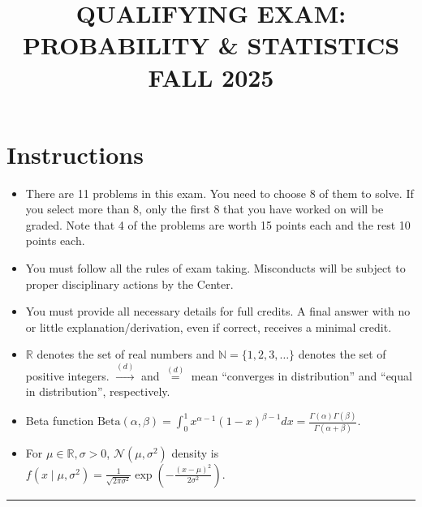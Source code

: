 \documentclass[11pt,a4paper]{article}
\title{\textbf{QUALIFYING EXAM: PROBABILITY \& STATISTICS}\\[0.5em]\Large FALL 2025}
\date{}
\author{}
\begin{document}
\maketitle
\vspace{-3em}

\section*{Instructions}
\begin{itemize}
    \item There are 11 problems in this exam. You need to choose 8 of them to solve. If you select more than 8, only the first 8 that you have worked on will be graded. Note that 4 of the problems are worth 15 points each and the rest 10 points each.
    \item You must follow all the rules of exam taking. Misconducts will be subject to proper disciplinary actions by the Center.
    \item You must provide all necessary details for full credits. A final answer with no or little explanation/derivation, even if correct, receives a minimal credit.
    \item $\mathbb{R}$ denotes the set of real numbers and $\mathbb{N} = \{1, 2, 3, \dots\}$ denotes the set of positive integers. $\xrightarrow{(d)}$ and $\stackrel{(d)}{=}$ mean ``converges in distribution'' and ``equal in distribution'', respectively.
    \item Beta function $\mathrm{Beta}(\alpha, \beta) = \int_0^1 x^{\alpha-1}(1-x)^{\beta-1} dx = \frac{\Gamma(\alpha)\Gamma(\beta)}{\Gamma(\alpha+\beta)}$.
    \item For $\mu \in \mathbb{R}, \sigma > 0$, $\mathcal{N}(\mu, \sigma^2)$ density is $f(x \mid \mu, \sigma^2) = \frac{1}{\sqrt{2\pi\sigma^2}} \exp\left(-\frac{(x-\mu)^2}{2\sigma^2}\right)$.
\end{itemize}

\noindent\rule{\linewidth}{0.4pt}
\end{document}
